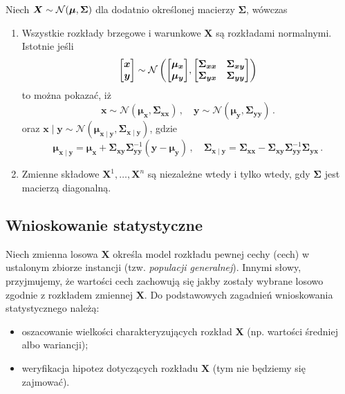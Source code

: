 \documentclass{myclass}
\numberwithin{equation}{subsection}
\begin{document}
\begin{theorem}\label{th:mvn} Niech \(\bm{X} \sim
\mathcal{N}(\bm{\mu}, \bm{\Sigma})\) dla dodatnio określonej macierzy \(\bm{\Sigma}\), wówczas
\begin{enumerate}
\item Wszystkie rozkłady brzegowe i warunkowe \(\bm{X}\) są rozkładami normalnymi. Istotnie jeśli
\[
\mqty[\bm{x} \\ \bm{y}] \sim \mathcal{N}\left(\mqty[\bm{\mu}_{\bm{x}} \\ \bm{\mu}_{\bm{y}}], \mqty[\bm{\Sigma}_{\bm{xx}} & \bm{\Sigma}_{\bm{xy}} \\ \bm{\Sigma}_{\bm{yx}} & \bm{\Sigma}_{\bm{yy}}] \right)
\]
to można pokazać, iż
\[
\bm{x} \sim \mathcal{N}(\bm{\mu}_{\bm{x}}, \bm{\Sigma}_{\bm{xx}})\,,\quad \bm{y} \sim \mathcal{N}(\bm{\mu}_{\bm{y}}, \bm{\Sigma}_{\bm{yy}})\,.
\]
oraz \(\bm{x} \mid \bm{y} \sim \mathcal{N}(\bm{\mu}_{\bm{x}\mid\bm{y}},
\bm{\Sigma}_{\bm{x}\mid\bm{y}})\), gdzie
\[
\bm{\mu}_{\bm{x}\mid\bm{y}} = \bm{\mu}_{\bm{x}} + \bm{\Sigma}_{\bm{xy}}\bm{\Sigma}_{\bm{yy}}^{-1}(\bm{y} - \bm{\mu}_{\bm{y}})\,,\quad \bm{\Sigma}_{\bm{x}\mid\bm{y}} = \bm{\Sigma}_{\bm{xx}} - \bm{\Sigma}_{\bm{xy}}\bm{\Sigma}_{\bm{yy}}^{-1}\bm{\Sigma}_{\bm{yx}}\,.
\]

\item Zmienne składowe \(\bm{X}^1,\ldots,\bm{X}^n\) są niezależne wtedy i tylko wtedy, gdy
\(\bm{\Sigma}\) jest macierzą diagonalną.
\end{enumerate}
\end{theorem}


\subsection{Wnioskowanie statystyczne}

Niech zmienna losowa \(\bm{X}\) określa model rozkładu pewnej cechy (cech) w ustalonym zbiorze
instancji (tzw. \emph{populacji generalnej}). Innymi słowy, przyjmujemy, że wartości cech zachowują
się jakby zostały wybrane losowo zgodnie z rozkładem zmiennej \(\bm{X}\). Do podstawowych zagadnień
wnioskowania statystycznego należą:
\begin{itemize}
\item oszacowanie wielkości charakteryzujących rozkład \(\bm{X}\) (np. wartości średniej albo
wariancji);
\item weryfikacja hipotez dotyczących rozkładu \(\bm{X}\) (tym nie będziemy się zajmować).
\end{itemize}
\end{document}
